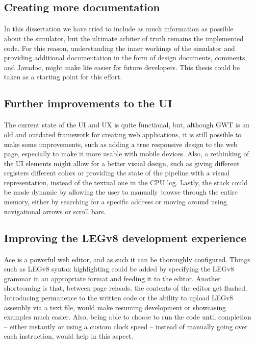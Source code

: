 \subsection{Creating more documentation}
\paragraph{}
In this dissertation we have tried to include as much information as possible about the simulator, but the ultimate arbiter of truth remains the implemented code. For this reason, understanding the inner workings of the simulator and providing additional documentation in the form of design documents, comments, and Javadoc, might make life easier for future developers. This thesis could be taken as a starting point for this effort.
\subsection{Further improvements to the UI}
\paragraph{}
The current state of the UI and UX is quite functional, but, although GWT is an old and outdated framework for creating web applications, it is still possible to make some improvements, such as adding a true responsive design to the web page, especially to make it more usable with mobile devices. Also, a rethinking of the UI elements might allow for a better visual design, such as giving different registers different colors or providing the state of the pipeline with a visual representation, instead of the textual one in the CPU log. Lastly, the stack could be made dynamic by allowing the user to manually browse through the entire memory, either by searching for a specific address or moving around using navigational arrows or scroll bars.
\subsection{Improving the LEGv8 development experience}
\paragraph{}
Ace is a powerful web editor, and as such it can be thoroughly configured. Things such as LEGv8 syntax highlighting could be added by specifying the LEGv8 grammar in an appropriate format and feeding it to the editor. Another shortcoming is that, between page reloads, the contents of the editor get flushed. Introducing permanence to the written code or the ability to upload LEGv8 assembly via a text file, would make resuming development or showcasing examples much easier. Also, being able to choose to run the code until completion -- either instantly or using a custom clock speed -- instead of manually going over each instruction, would help in this aspect.

